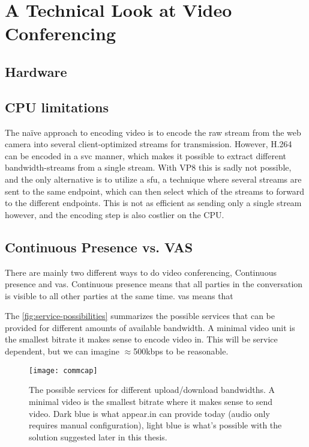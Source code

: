 

\section{A Technical Look at Video Conferencing}

\subsection{Hardware}



\subsection{CPU limitations}

The naïve approach to encoding video is to encode the raw stream from the web camera into several client-optimized streams for transmission. However, H.264 can be encoded in a \gls{svc} manner, which makes it possible to extract different bandwidth-streams from a single stream. With VP8 this is sadly not possible, and the only alternative is to utilize a \gls{sfu}, a technique where several streams are sent to the same endpoint, which can then select which of the streams to forward to the different endpoints. This is not as efficient as sending only a single stream however, and the encoding step is also costlier on the CPU.


\subsection{Continuous Presence vs. VAS}

There are mainly two different ways to do video conferencing, Continuous presence and \gls{vas}. Continuous presence means that all parties in the conversation is visible to all other parties at the same time. \gls{vas} means that

The \autoref{fig:service-possibilities} summarizes the possible services that can be provided for different amounts of available bandwidth. A minimal video unit is the smallest bitrate it makes sense to encode video in. This will be service dependent, but we can imagine $\approx$500kbps to be reasonable.

\begin{figure}
    \centering
    \texttt{[image: commcap]}
    \caption{The possible services for different upload/download bandwidths. A minimal video is the smallest bitrate where it makes sense to send video. Dark blue is what appear.in can provide today (audio only requires manual configuration), light blue is what's possible with the solution suggested later in this thesis.}
    \label{fig:service-possibilities}
\end{figure}


